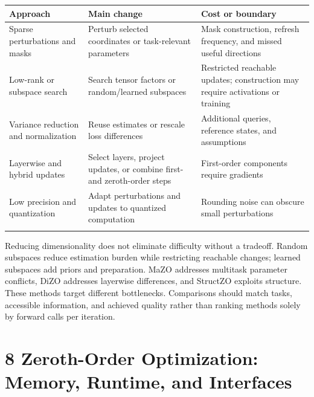 \begin{longtable}{>{\raggedright\arraybackslash}p{4.85cm}>{\raggedright\arraybackslash}p{4.85cm}>{\raggedright\arraybackslash}p{4.85cm}}

\toprule

\textbf{Approach} & \textbf{Main change} & \textbf{Cost or boundary}\\\midrule\endhead

Sparse perturbations and masks \cite{r57,r62,r73} & Perturb selected coordinates or task-relevant parameters & Mask construction, refresh frequency, and missed useful directions\\\addlinespace[3pt]

Low-rank or subspace search \cite{r66,r68,r69,r84,r85} & Search tensor factors or random/learned subspaces & Restricted reachable updates; construction may require activations or training\\\addlinespace[3pt]

Variance reduction and normalization \cite{r65,r78,r79} & Reuse estimates or rescale loss differences & Additional queries, reference states, and assumptions\\\addlinespace[3pt]

Layerwise and hybrid updates \cite{r61,r67,r70,r71} & Select layers, project updates, or combine first- and zeroth-order steps & First-order components require gradients\\\addlinespace[3pt]

Low precision and quantization \cite{r74} & Adapt perturbations and updates to quantized computation & Rounding noise can obscure small perturbations\\\addlinespace[3pt]

\bottomrule\end{longtable}\endgroup

Reducing dimensionality does not eliminate difficulty without a tradeoff. Random subspaces reduce estimation burden while restricting reachable changes; learned subspaces add priors and preparation. MaZO addresses multitask parameter conflicts, DiZO addresses layerwise differences, and StructZO exploits structure.\cite{r71,r73,r85} These methods target different bottlenecks. Comparisons should match tasks, accessible information, and achieved quality rather than ranking methods solely by forward calls per iteration.


\section*{8 Zeroth-Order Optimization: Memory, Runtime, and Interfaces}

